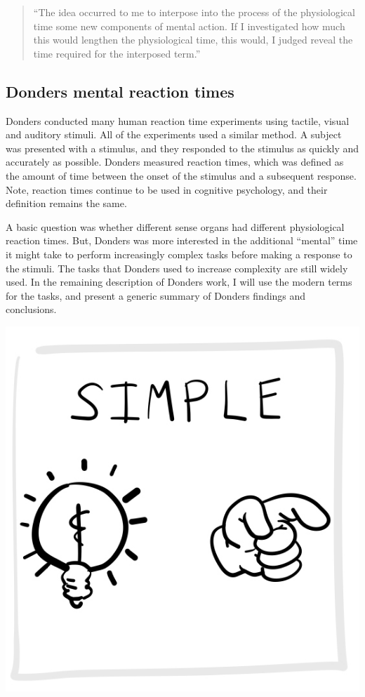\documentclass[
  oneside,
  12pt]{crumpbook}
\newenvironment{floatright25}{%
  \wrapfigure{R}{.25\textwidth}%
  }{%
  \endwrapfigure}
\begin{document}
\begin{quote}
``The idea occurred to me to interpose into the process of the physiological time some new components of mental action. If I investigated how much this would lengthen the physiological time, this would, I judged reveal the time required for the interposed term.''
\end{quote}

\hypertarget{donders-mental-reaction-times}{%
\subsection{Donders mental reaction times}\label{donders-mental-reaction-times}}

Donders conducted many human reaction time experiments using tactile, visual and auditory stimuli. All of the experiments used a similar method. A subject was presented with a stimulus, and they responded to the stimulus as quickly and accurately as possible. Donders measured reaction times, which was defined as the amount of time between the onset of the stimulus and a subsequent response. Note, reaction times continue to be used in cognitive psychology, and their definition remains the same.

A basic question was whether different sense organs had different physiological reaction times. But, Donders was more interested in the additional ``mental'' time it might take to perform increasingly complex tasks before making a response to the stimuli. The tasks that Donders used to increase complexity are still widely used. In the remaining description of Donders work, I will use the modern terms for the tasks, and present a generic summary of Donders findings and conclusions.

\begin{floatright25}
\includegraphics[width=1\linewidth]{imgs/Donders_simple}

\end{floatright25}
\end{document}
